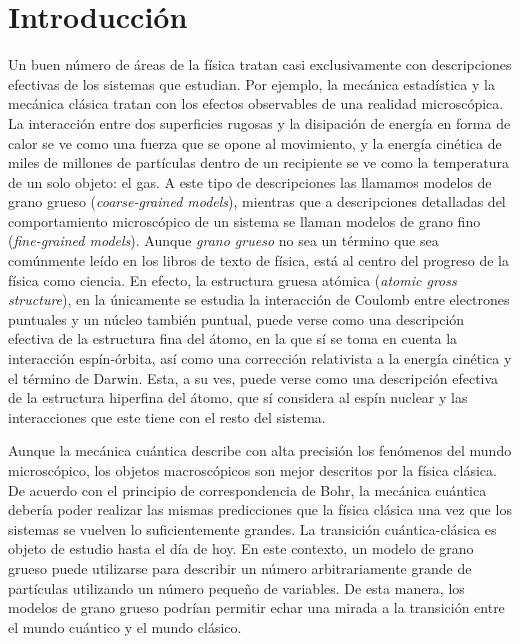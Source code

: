 \chapter{Introducción}



Un buen número de áreas de la física tratan casi exclusivamente con descripciones efectivas de los sistemas que estudian. Por ejemplo, la mecánica estadística y la mecánica clásica tratan con los efectos observables de una realidad microscópica. La interacción entre dos superficies rugosas y la disipación de energía en forma de calor se ve como una fuerza que se opone al movimiento, y la energía cinética de miles de millones de partículas dentro de un recipiente se ve como la temperatura de un solo objeto: el gas. A este tipo de descripciones las llamamos modelos de grano grueso (\textit{coarse-grained models}), mientras que a descripciones detalladas del comportamiento microscópico de un sistema se llaman modelos de grano fino (\textit{fine-grained models}). Aunque \textit{grano grueso} no sea un término que sea comúnmente leído en los libros de texto de física, está al centro del progreso de la física como ciencia. En efecto, la estructura gruesa atómica (\textit{atomic gross structure}), en la únicamente se estudia la interacción de Coulomb entre electrones puntuales y un núcleo también puntual, puede verse como una descripción efectiva de la estructura fina del átomo, en la que sí se toma en cuenta la interacción espín-órbita, así como una corrección relativista a la energía cinética y el término de Darwin. Esta, a su ves, puede verse como una descripción efectiva de la estructura hiperfina del átomo, que sí considera al espín nuclear y las interacciones que este tiene con el resto del sistema.


Aunque la mecánica cuántica describe con alta precisión los fenómenos del mundo microscópico, los objetos macroscópicos son mejor descritos por la física clásica. De acuerdo con el principio de correspondencia de Bohr, la mecánica cuántica debería poder realizar las mismas predicciones que la física clásica una vez que los sistemas se vuelven lo suficientemente grandes. La transición cuántica-clásica es objeto de estudio hasta el día de hoy. En este contexto, un modelo de grano grueso puede utilizarse para describir un número arbitrariamente grande de partículas utilizando un número pequeño de variables. De esta manera, los modelos de grano grueso podrían permitir echar una mirada a la transición entre el mundo cuántico y el mundo clásico.

